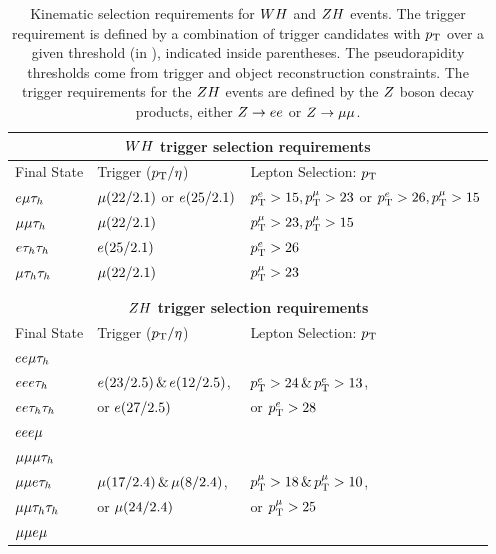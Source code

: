 \begin{table}[htbp]
\centering
\begin{small}
\begin{tabular}{lll}
     \multicolumn{3}{c}{ \textbf{$WH$ trigger selection requirements} }                \\ 
\hline
  Final State           &         Trigger ($p_\mathrm{T}/\eta$)         & Lepton Selection: $p_\mathrm{T}$     \\
\hline
 $e\mu\tau_{h}$      &  $\mu (22/2.1)$ or $e (25/2.1)$  &     $p_\mathrm{T}^{e}>15, p_\mathrm{T}^{\mu}>23$ or $p_\mathrm{T}^{e}>26, p_\mathrm{T}^{\mu}>15$  \\ 
 $\mu\mu\tau_{h}$     &  $\mu (22/2.1)$                    &     $p_\mathrm{T}^{\mu}>23,p_\mathrm{T}^{\mu}>15$                               \\ 
 $e\tau_{h}\tau_{h}$     &  $e (25/2.1)$                     &     $p_\mathrm{T}^{e}>26$                                            \\ 
 $\mu\tau_{h}\tau_{h}$    &  $\mu (22/2.1)$                    &     $p_\mathrm{T}^{\mu}>23$                                           \\ 
\hline \\

\\
     \multicolumn{3}{c}{ \textbf{$ZH$ trigger selection requirements} }                \\ 
\hline
  Final State           &         Trigger ($p_\mathrm{T}/\eta$)         & Lepton Selection: $p_\mathrm{T}$             \\
\hline
  $ee\mu\tau_{h}$     &                                    &                                   \\ 
  $eee\tau_{h}$      & $e(23/2.5)\,\&\,e(12/2.5)$,    &  $p_\mathrm{T}^{e}>24\,\&\,p_\mathrm{T}^{e}>13$,    \\ 
  $ee\tau_{h}\tau_{h}$    & or $e(27/2.5)$                   &  or $p_\mathrm{T}^{e}>28$                  \\ 
  $eee\mu$       &                                    &                                   \\ 
\hline
  $\mu\mu\mu\tau_{h}$   &                                    &                                   \\ 
  $\mu\mu e\tau_{h}$    &  $\mu(17/2.4)\,\&\,\mu(8/2.4)$,  &  $p_\mathrm{T}^{\mu}>18\,\&\,p_\mathrm{T}^{\mu}>10$,  \\ 
  $\mu\mu\tau_{h}\tau_{h}$  &   or $\mu(24/2.4)$                &  or $p_\mathrm{T}^{\mu}>25$                 \\ 
  $\mu\mu e\mu$     &                                    &                                   \\ 
\hline
\end{tabular}
\end{small}
\caption{Kinematic selection requirements for $WH$ and $ZH$ events.
The trigger requirement is defined by a combination of trigger candidates with 
$p_\mathrm{T}$ over a given threshold (in \GeV), indicated inside parentheses. The 
pseudorapidity thresholds come from trigger and object reconstruction constraints.
The trigger requirements for the $ZH$ events are defined by the $Z$ boson
decay products, either $Z\to ee$ or $Z\to\mu\mu$.
\label{tab:vh_triggers}
}
\end{table}
